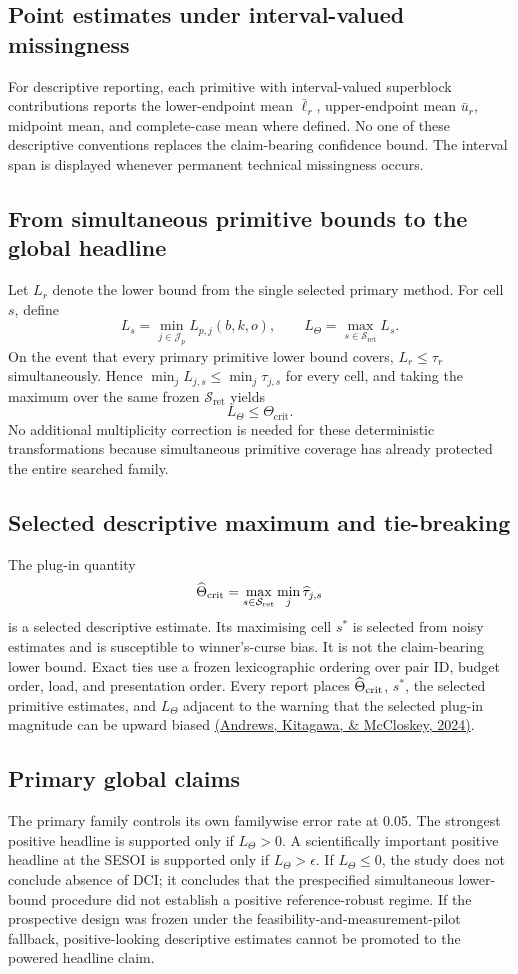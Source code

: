 \documentclass[11pt,a4paper]{article}
\newcommand{\Tcrit}{\Theta_{\mathrm{crit}}}
\newcommand{\Sc}{\mathcal S_{\mathrm{ret}}}
\begin{document}
\subsection{Point estimates under interval-valued missingness}
For descriptive reporting, each primitive with interval-valued superblock contributions reports the lower-endpoint mean $\bar\ell_r$, upper-endpoint mean $\bar u_r$, midpoint mean, and complete-case mean where defined. No one of these descriptive conventions replaces the claim-bearing confidence bound. The interval span is displayed whenever permanent technical missingness occurs.

\subsection{From simultaneous primitive bounds to the global headline}
Let $L_r$ denote the lower bound from the single selected primary method. For cell $s$, define
\[
L_s=\min_{j\in\mathcal J_p}L_{p,j}(b,k,o),
\qquad
L_\Theta=\max_{s\in\Sc}L_s.
\]
On the event that every primary primitive lower bound covers, $L_r\le\tau_r$ simultaneously. Hence $\min_jL_{j,s}\le\min_j\tau_{j,s}$ for every cell, and taking the maximum over the same frozen $\Sc$ yields
\[
L_\Theta\le\Tcrit.
\]
No additional multiplicity correction is needed for these deterministic transformations because simultaneous primitive coverage has already protected the entire searched family.

\subsection{Selected descriptive maximum and tie-breaking}
The plug-in quantity
\[
\widehat\Theta_{\rm crit}=\max_{s\in\Sc}\min_j\widehat\tau_{j,s}
\]
is a selected descriptive estimate. Its maximising cell $s^\ast$ is selected from noisy estimates and is susceptible to winner's-curse bias. It is not the claim-bearing lower bound. Exact ties use a frozen lexicographic ordering over pair ID, budget order, load, and presentation order. Every report places $\widehat\Theta_{\rm crit}$, $s^\ast$, the selected primitive estimates, and $L_\Theta$ adjacent to the warning that the selected plug-in magnitude can be upward biased \href{https://doi.org/10.1093/qje/qjad043}{(Andrews, Kitagawa, \& McCloskey, 2024)}.

\subsection{Primary global claims}
The primary family controls its own familywise error rate at 0.05. The strongest positive headline is supported only if $L_\Theta>0$. A scientifically important positive headline at the SESOI is supported only if $L_\Theta>\epsilon$. If $L_\Theta\le0$, the study does not conclude absence of DCI; it concludes that the prespecified simultaneous lower-bound procedure did not establish a positive reference-robust regime. If the prospective design was frozen under the feasibility-and-measurement-pilot fallback, positive-looking descriptive estimates cannot be promoted to the powered headline claim.
\end{document}
